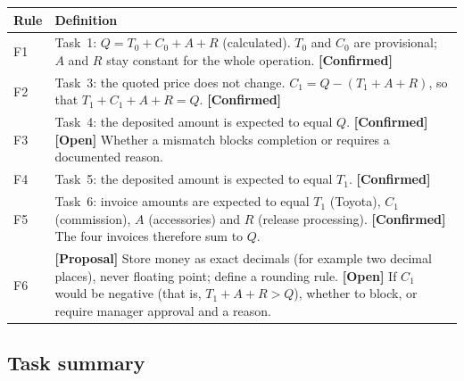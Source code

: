 \documentclass[11pt,a4paper]{article}
\newcommand{\tagconf}{\textcolor{green!45!black}{\textbf{[Confirmed]}}}
\newcommand{\tagprop}{\textcolor{orange!80!black}{\textbf{[Proposal]}}}
\newcommand{\tagopen}{\textcolor{red!70!black}{\textbf{[Open]}}}
\begin{document}
\begin{longtable}{@{}L{1.2cm}L{14.6cm}@{}}
	\toprule
	\textbf{Rule} & \textbf{Definition}
	\\
	\midrule
	\endhead
	F1            & Task~1: $Q = T_0 + C_0 + A + R$ (calculated). $T_0$ and $C_0$
	are provisional; $A$ and $R$ stay constant for the whole operation. \tagconf{}
	\\
	F2            & Task~3: the quoted price does not change. $C_1 = Q - (T_1 + A
		                                                          + R)$, so that
	$T_1 + C_1 + A + R = Q$. \tagconf{}
	\\
	F3            & Task~4: the deposited amount is expected to equal $Q$.
	\tagconf{}
	\tagopen{} Whether a mismatch blocks completion or requires a documented
	reason.
	\\
	F4            & Task~5: the deposited amount is expected to equal $T_1$.
	\tagconf{}
	\\
	F5            & Task~6: invoice amounts are expected to equal $T_1$ (Toyota),
	$C_1$ (commission), $A$ (accessories) and $R$ (release processing). \tagconf{}
	The four invoices therefore sum to $Q$.
	\\
	F6            & \tagprop{} Store money as exact decimals (for example two
	decimal places),
	never floating point; define a rounding rule. \tagopen{} If $C_1$ would be
	negative (that is, $T_1 + A + R > Q$), whether to block, or require manager
	approval and a reason.
	\\
	\bottomrule
\end{longtable}

\subsection{Task summary}
\end{document}
